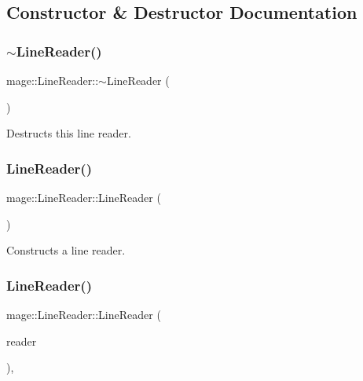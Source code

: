 \subsection{Constructor \& Destructor Documentation}
\hypertarget{classmage_1_1_line_reader_ad9753ea392ebe5b3867852d3392fb1e7}{}\label{classmage_1_1_line_reader_ad9753ea392ebe5b3867852d3392fb1e7} 
\subsubsection{\texorpdfstring{$\sim$\+Line\+Reader()}{~LineReader()}}
{\footnotesize\ttfamily mage\+::\+Line\+Reader\+::$\sim$\+Line\+Reader (\begin{DoxyParamCaption}{ }\end{DoxyParamCaption})\hspace{0.3cm}{\ttfamily [virtual]}}

Destructs this line reader. \hypertarget{classmage_1_1_line_reader_ab4a46321d7ea3ecda2d6390c78a7285b}{}\label{classmage_1_1_line_reader_ab4a46321d7ea3ecda2d6390c78a7285b} 
\subsubsection{\texorpdfstring{Line\+Reader()}{LineReader()}\hspace{0.1cm}{\footnotesize\ttfamily [1/3]}}
{\footnotesize\ttfamily mage\+::\+Line\+Reader\+::\+Line\+Reader (\begin{DoxyParamCaption}{ }\end{DoxyParamCaption})\hspace{0.3cm}{\ttfamily [protected]}}

Constructs a line reader. \hypertarget{classmage_1_1_line_reader_ae4f871bebae110704b34c0bd88460639}{}\label{classmage_1_1_line_reader_ae4f871bebae110704b34c0bd88460639} 
\subsubsection{\texorpdfstring{Line\+Reader()}{LineReader()}\hspace{0.1cm}{\footnotesize\ttfamily [2/3]}}
{\footnotesize\ttfamily mage\+::\+Line\+Reader\+::\+Line\+Reader (\begin{DoxyParamCaption}\item[{const \hyperlink{classmage_1_1_line_reader}{Line\+Reader} \&}]{reader }\end{DoxyParamCaption})\hspace{0.3cm}{\ttfamily [protected]}, {\ttfamily [delete]}}

